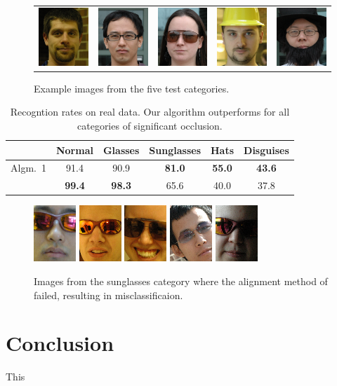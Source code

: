 \begin{figure}
\begin{tabular}{ccccc}
\includegraphics[width=\imagewidth]{figures_iccv/real_data_examples/normal_5.jpg} & \includegraphics[width=\imagewidth]{figures_iccv/real_data_examples/glasses_5.jpg} & \includegraphics[width=\imagewidth]{figures_iccv/real_data_examples/sunglasses_5.jpg} & \includegraphics[width=\imagewidth]{figures_iccv/real_data_examples/hats_5.jpg} & \includegraphics[width=\imagewidth]{figures_iccv/real_data_examples/disguise_5.jpg}
\end{tabular}
\caption{Example images from the five test categories.} \label{fig:real-data-ex}
\end{figure}

\begin{table}[t]
\centering
\begin{tabular}{|c|c|c|c|c|c|}
\hline
& Normal & Glasses & Sunglasses & Hats & Disguises \\
\hline
Algm.\ 1 & 91.4 & 90.9 & {\bf 81.0} & {\bf 55.0} & {\bf 43.6} \\
\hline
\cite{Wright2009-PAMI} & {\bf 99.4} & {\bf 98.3} & 65.6 & 40.0 & 37.8 \\
\hline
\end{tabular}
\caption{Recogntion rates on real data. Our algorithm outperforms \cite{Wright2009-PAMI} for all categories of significant occlusion.} \label{tab:real-data-rates}
\end{table}

\begin{figure}
\centering
\newcommand{\imagewidth}{.8in}
\includegraphics[width=\imagewidth]{figures_iccv/sunglass_examples/failed/1.png}
\includegraphics[width=\imagewidth]{figures_iccv/sunglass_examples/failed/2.png}
\includegraphics[width= \imagewidth]{figures_iccv/sunglass_examples/failed/3.png}
\includegraphics[width= \imagewidth]{figures_iccv/sunglass_examples/failed/4.png}
\includegraphics[width= \imagewidth]{figures_iccv/sunglass_examples/failed/5.png}
\caption{Images from the sunglasses category where the alignment method of \cite{Wagner2009-CVPR} failed, resulting in misclassificaion.} \label{fig:registration} \vspace{0mm}
\end{figure}

\section{Conclusion}
This